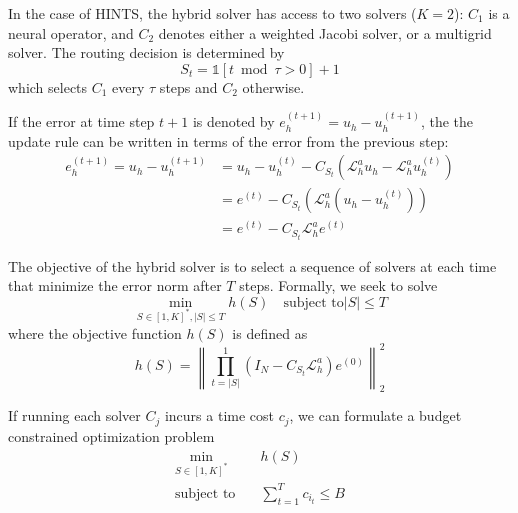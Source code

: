 \documentclass[12pt]{article}
\begin{document}
\begin{example}[HINTS] In the case of HINTS, the hybrid solver has access to two solvers ($K = 2$):  $C_1$ is a neural operator, and $C_2$ denotes either a weighted Jacobi solver, or a multigrid solver. The routing decision is determined by $$S_t = \mathds{1}\left[t \bmod \tau > 0\right] + 1$$
which selects $C_1$ every $\tau$ steps and $C_2$ otherwise.
\end{example}

If the error at time step $t + 1$ is denoted by $e^{(t + 1)}_h = u_h - u^{\left(t + 1\right)}_h$, the the update rule can be written in terms of the error from the previous step:
\begin{align*}
    e^{(t + 1)}_h = u_h - u^{\left(t + 1\right)}_h &= u_h -  u^{\left(t\right)}_h -C_{S_t}\left(\mathcal{L}_h^au_h - \mathcal{L}_h^au^{\left(t\right)}_h\right)  \\
    &= e^{(t)} - C_{S_t}\left(\mathcal{L}_h^a\left(u_h-u^{\left(t\right)}_h\right)\right) \\
    &= e^{(t)} - C_{S_t}\mathcal{L}_h^ae^{(t)}
\end{align*}


The objective of the hybrid solver is to select a sequence of solvers at each time that minimize the error norm after $T$ steps. Formally, we seek to solve 
\begin{equation} \label{eq:errorobjective}
    \min_{S \in [1, K]^*, |S| \leq T} h(S) \quad \text{subject to} |S| \leq T
\end{equation}
where the objective function $h(S)$ is defined as
\begin{equation} \label{eq:errorobjective2}
    h(S) = \left\|\prod_{t = |S|}^1\left(I_N - C_{S_t} \mathcal{L}_h^a\right)  e^{(0)} \right\|^2_2
\end{equation}

If running each solver $C_{j}$ incurs a time cost $c_j$, we can formulate a budget constrained optimization problem
\begin{align*}
    \min_{S \in [1, K]^*} & h(S) \\
    \text{subject to} \quad &\sum_{t = 1}^T c_{i_t} \leq B
\end{align*}
\end{document}

